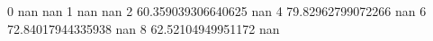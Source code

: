 0 nan nan
1 nan nan
2 60.359039306640625 nan
4 79.82962799072266 nan
6 72.84017944335938 nan
8 62.52104949951172 nan
